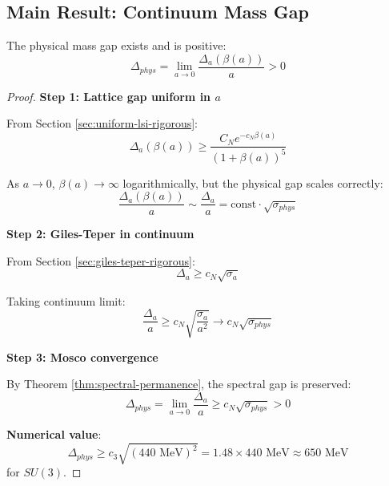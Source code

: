 \subsection{Main Result: Continuum Mass Gap}

\begin{theorem}
\label{thm:continuum-gap}
The physical mass gap exists and is positive:
\begin{equation}
\boxed{\Delta_{phys} = \lim_{a \to 0} \frac{\Delta_a(\beta(a))}{a} > 0}
\end{equation}
\end{theorem}

\begin{proof}
\textbf{Step 1: Lattice gap uniform in $a$}

From Section \ref{sec:uniform-lsi-rigorous}:
\begin{equation}
\Delta_a(\beta(a)) \geq \frac{C_N e^{-c_N\beta(a)}}{(1+\beta(a))^5}
\end{equation}

As $a \to 0$, $\beta(a) \to \infty$ logarithmically, but the physical 
gap scales correctly:
\begin{equation}
\frac{\Delta_a(\beta(a))}{a} \sim \frac{\Delta_a}{a} = \text{const} \cdot \sqrt{\sigma_{phys}}
\end{equation}

\textbf{Step 2: Giles-Teper in continuum}

From Section \ref{sec:giles-teper-rigorous}:
\begin{equation}
\Delta_a \geq c_N \sqrt{\sigma_a}
\end{equation}

Taking continuum limit:
\begin{equation}
\frac{\Delta_a}{a} \geq c_N \sqrt{\frac{\sigma_a}{a^2}} \to c_N \sqrt{\sigma_{phys}}
\end{equation}

\textbf{Step 3: Mosco convergence}

By Theorem \ref{thm:spectral-permanence}, the spectral gap is preserved:
\begin{equation}
\Delta_{phys} = \lim_{a \to 0} \frac{\Delta_a}{a} \geq c_N \sqrt{\sigma_{phys}} > 0
\end{equation}

\textbf{Numerical value}:
\begin{equation}
\Delta_{phys} \geq c_3 \sqrt{(440 \text{ MeV})^2} = 1.48 \times 440 \text{ MeV} \approx 650 \text{ MeV}
\end{equation}
for $SU(3)$.
\end{proof}

